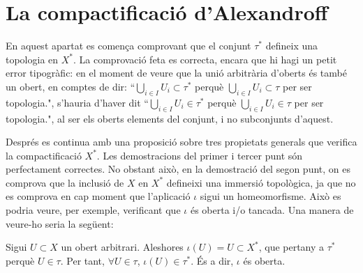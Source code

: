 \documentclass{article}
\begin{document}
\section{La compactificació d'Alexandroff}

En aquest apartat es comença comprovant que el conjunt $\tau^*$ defineix una topologia en $X^*$. La comprovació feta es correcta, encara que hi hagi un petit error tipogràfic: en el moment de veure que la unió arbitrària d'oberts és també un obert, en comptes de dir:
``$\bigcup_{i\in I} U_i \subset \tau^*$ perquè $\bigcup_{i\in I} U_i \subset \tau$ per ser topologia.", s'hauria d'haver dit ``$\bigcup_{i\in I} U_i \in \tau^*$ perquè $\bigcup_{i\in I} U_i \in \tau$ per ser topologia.", al ser els oberts elements del conjunt, i no subconjunts d'aquest.

\par
Després es continua amb una proposició sobre tres propietats generals que verifica la compactificació $X^*$. Les demostracions del primer i tercer punt són perfectament correctes. No obstant això, en la demostració del segon punt, on es comprova que la inclusió de $X$ en $X^*$ defineixi una immersió topològica, ja que no es comprova en cap moment que l'aplicació $\iota$ sigui un homeomorfisme. Això es podria veure, per exemple, verificant que $\iota$ és oberta i/o tancada. Una manera de veure-ho seria la següent:

Sigui $U\subset X$ un obert arbitrari. Aleshores $\iota(U)=U\subset X^*$, que pertany a $\tau^*$ perquè $U\in\tau$. Per tant, $\forall U\in\tau$, $\iota(U)\in\tau^*$. És a dir, $\iota$ és oberta.
\end{document}
